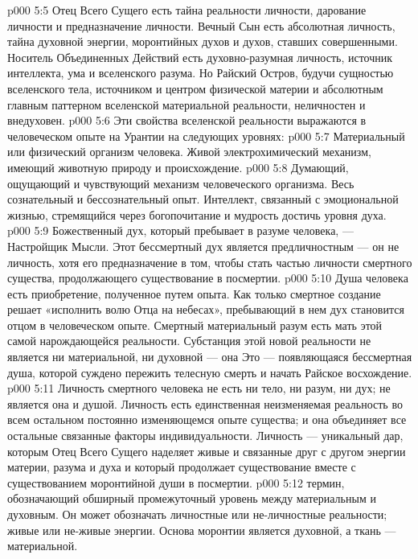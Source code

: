 \vs p000 5:5 \pc Отец Всего Сущего есть тайна реальности личности, дарование личности и предназначение личности. Вечный Сын есть абсолютная личность, тайна духовной энергии, моронтийных духов и духов, ставших совершенными. Носитель Объединенных Действий есть духовно\hyp{}разумная личность, источник интеллекта, ума и вселенского разума. Но Райский Остров, будучи сущностью вселенского тела, источником и центром физической материи и абсолютным главным паттерном вселенской материальной реальности, неличностен и внедуховен.
\vs p000 5:6 \pc Эти свойства вселенской реальности выражаются в человеческом опыте на Урантии на следующих уровнях:
\vs p000 5:7 \bibnobreakspace {} Материальный или физический организм человека. Живой электрохимический механизм, имеющий животную природу и происхождение.
\vs p000 5:8 \bibnobreakspace {} Думающий, ощущающий и чувствующий механизм человеческого организма. Весь сознательный и бессознательный опыт. Интеллект, связанный с эмоциональной жизнью, стремящийся через богопочитание и мудрость достичь уровня духа.
\vs p000 5:9 \bibnobreakspace {} Божественный дух, который пребывает в разуме человека, --- Настройщик Мысли. Этот бессмертный дух является предличностным --- он не личность, хотя его предназначение в том, чтобы стать частью личности смертного существа, продолжающего существование в посмертии.
\vs p000 5:10 \bibnobreakspace {} Душа человека есть приобретение, полученное путем опыта. Как только смертное создание решает «исполнить волю Отца на небесах», пребывающий в нем дух становится отцом  в человеческом опыте. Смертный материальный разум есть мать этой самой нарождающейся реальности. Субстанция этой новой реальности не является ни материальной, ни духовной --- она  Это --- появляющаяся бессмертная душа, которой суждено пережить телесную смерть и начать Райское восхождение.
\vs p000 5:11 \pc {}\bibnobreakspace {} Личность смертного человека не есть ни тело, ни разум, ни дух; не является она и душой. Личность есть единственная неизменяемая реальность во всем остальном постоянно изменяющемся опыте существа; и она объединяет все остальные связанные факторы индивидуальности. Личность --- уникальный дар, которым Отец Всего Сущего наделяет живые и связанные друг с другом энергии материи, разума и духа и который продолжает существование вместе с существованием моронтийной души в посмертии.
\vs p000 5:12 \pc {}\bibnobreakspace {} термин, обозначающий обширный промежуточный уровень между материальным и духовным. Он может обозначать личностные или не\hyp{}личностные реальности; живые или не\hyp{}живые энергии. Основа моронтии является духовной, а ткань --- материальной.
